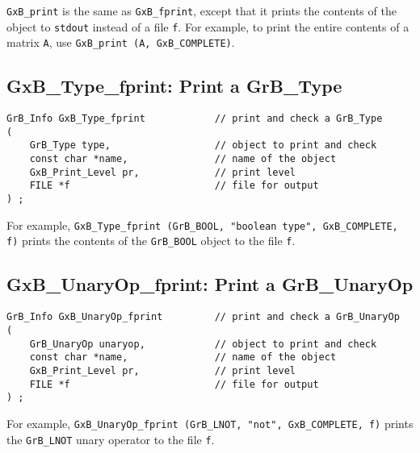 \documentclass[12pt]{article}
\begin{document}
{\verb'GxB_print' is the same as \verb'GxB_fprint', except that it prints the
contents of the object to \verb'stdout' instead of a file \verb'f'.  For
example, to print the entire contents of a matrix \verb'A',  use
\verb'GxB_print (A, GxB_COMPLETE)'.

\subsection{{\sf GxB\_Type\_fprint:} Print a {\sf GrB\_Type}}

\begin{mdframed}[userdefinedwidth=6in]
{\footnotesize
\begin{verbatim}
GrB_Info GxB_Type_fprint            // print and check a GrB_Type
(
    GrB_Type type,                  // object to print and check
    const char *name,               // name of the object
    GxB_Print_Level pr,             // print level
    FILE *f                         // file for output
) ;
\end{verbatim} } \end{mdframed}

For example, \verb'GxB_Type_fprint (GrB_BOOL, "boolean type", GxB_COMPLETE, f)'
prints the contents of the \verb'GrB_BOOL' object to the file \verb'f'.

\newpage
\subsection{{\sf GxB\_UnaryOp\_fprint:} Print a {\sf GrB\_UnaryOp}}

\begin{mdframed}[userdefinedwidth=6in]
{\footnotesize
\begin{verbatim}
GrB_Info GxB_UnaryOp_fprint         // print and check a GrB_UnaryOp
(
    GrB_UnaryOp unaryop,            // object to print and check
    const char *name,               // name of the object
    GxB_Print_Level pr,             // print level
    FILE *f                         // file for output
) ;
\end{verbatim} } \end{mdframed}

For example,
\verb'GxB_UnaryOp_fprint (GrB_LNOT, "not", GxB_COMPLETE, f)'
prints the \verb'GrB_LNOT' unary operator to the file \verb'f'.


}
\end{document}
